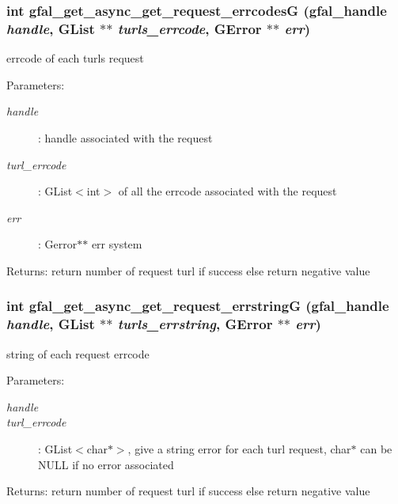 \subsubsection{\setlength{\rightskip}{0pt plus 5cm}int gfal\_\-get\_\-async\_\-get\_\-request\_\-errcodes\-G (gfal\_\-handle {\em handle}, GList $\ast$$\ast$ {\em turls\_\-errcode}, GError $\ast$$\ast$ {\em err})}\label{gfal__common__srm_8h_882da2b766bd2a686e7bda9421cb7cbf}


errcode of each turls request 

\begin{Desc}
\item[Parameters:]
\begin{description}
\item[{\em handle}]: handle associated with the request \item[{\em turl\_\-errcode}]: GList$<$int$>$ of all the errcode associated with the request \item[{\em err}]: Gerror$\ast$$\ast$ err system \end{description}
\end{Desc}
\begin{Desc}
\item[Returns:]return number of request turl if success else return negative value \end{Desc}
\subsubsection{\setlength{\rightskip}{0pt plus 5cm}int gfal\_\-get\_\-async\_\-get\_\-request\_\-errstring\-G (gfal\_\-handle {\em handle}, GList $\ast$$\ast$ {\em turls\_\-errstring}, GError $\ast$$\ast$ {\em err})}\label{gfal__common__srm_8h_c60fa3f3565e1be54184e71ad1f2f3ea}


string of each request errcode 

\begin{Desc}
\item[Parameters:]
\begin{description}
\item[{\em handle}]\item[{\em turl\_\-errcode}]: GList$<$char$\ast$$>$, give a string error for each turl request, char$\ast$ can be NULL if no error associated \end{description}
\end{Desc}
\begin{Desc}
\item[Returns:]return number of request turl if success else return negative value \end{Desc}
